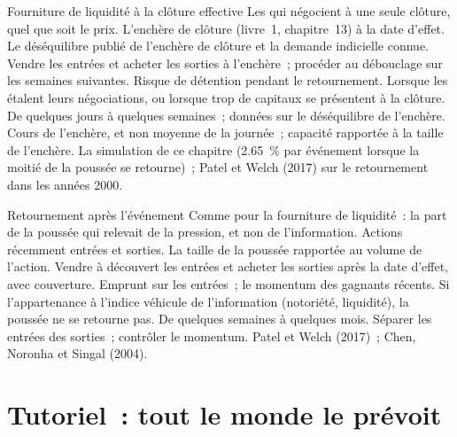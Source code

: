 \begin{strategyfile}{Fourniture de liquidité à la clôture effective}\label{strat:s1:index-rebalancing:liquidity}
 Les  qui négocient à une seule clôture, quel que soit le prix.
 L'enchère de clôture (livre~1, chapitre~13) à la date d'effet.
 Le déséquilibre publié de l'enchère de clôture et la demande indicielle connue.
 Vendre les entrées et acheter les sorties à l'enchère~; procéder au débouclage sur les semaines suivantes.
 Risque de détention pendant le retournement.
 Lorsque les  étalent leurs négociations, ou lorsque trop de capitaux se présentent à la clôture.
 De quelques jours à quelques semaines~; données sur le déséquilibre de l'enchère.
 Cours de l'enchère, et non moyenne de la journée~; capacité rapportée à la taille de l'enchère.
 La simulation de ce chapitre (2.65~\% par événement lorsque la moitié de la poussée se retourne)~; Patel et Welch (2017) sur le retournement dans les années 2000.
\end{strategyfile}

\begin{strategyfile}{Retournement après l'événement}\label{strat:s1:index-rebalancing:reversal}
 Comme pour la fourniture de liquidité~: la part de la poussée qui relevait de la pression, et non de l'information.
 Actions récemment entrées et sorties.
 La taille de la poussée rapportée au volume de l'action.
 Vendre à découvert les entrées et acheter les sorties après la date d'effet, avec couverture.
 Emprunt sur les entrées~; le momentum des gagnants récents.
 Si l'appartenance à l'indice véhicule de l'information (notoriété, liquidité), la poussée ne se retourne pas.
 De quelques semaines à quelques mois.
 Séparer les entrées des sorties~; contrôler le momentum.
 Patel et Welch (2017)~; Chen, Noronha et Singal (2004).
\end{strategyfile}

\section{Tutoriel~: tout le monde le prévoit}\label{tut:s1:index-rebalancing:tut}

